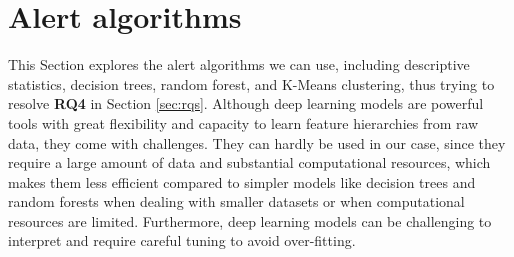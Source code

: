 


\section{Alert algorithms}
This Section explores the alert algorithms we can use, including descriptive statistics, decision trees, random forest, and K-Means clustering, thus trying to resolve \textbf{RQ4} in Section \ref{sec:rqs}. Although deep learning models are powerful tools with great flexibility and capacity to learn feature hierarchies from raw data, they come with challenges. They can hardly be used in our case, since they require a large amount of data and substantial computational resources, which makes them less efficient compared to simpler models like decision trees and random forests when dealing with smaller datasets or when computational resources are limited. Furthermore, deep learning models can be challenging to interpret and require careful tuning to avoid over-fitting.

